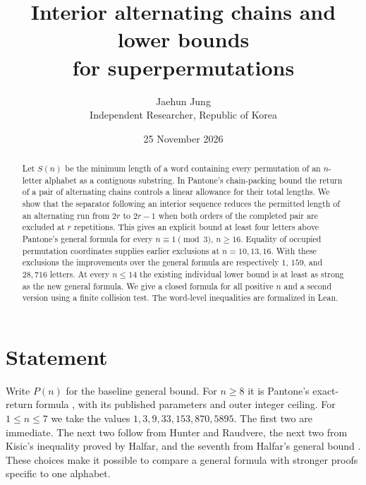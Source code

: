 \documentclass[11pt]{article}
\title{\bfseries Interior alternating chains and lower bounds\\for superpermutations}
\author{Jaehun Jung\\{\small Independent Researcher, Republic of Korea}}
\date{25 November 2026}
\begin{document}
\maketitle
\begin{abstract}
Let $S(n)$ be the minimum length of a word containing every permutation of an
$n$-letter alphabet as a contiguous substring.
In Pantone's chain-packing bound the return of a pair of alternating chains
controls a linear allowance for their total lengths. We show that the
separator following an interior sequence reduces the permitted length of an
alternating run from $2r$ to $2r-1$ when both orders of the completed pair
are excluded at $r$ repetitions. This gives an explicit bound at least four
letters above Pantone's general formula for every $n\equiv1\pmod 3$, $n\ge16$.
Equality of occupied permutation coordinates supplies earlier exclusions at
$n=10,13,16$. With these exclusions the improvements over the general formula
are respectively $1$, $159$, and $28{,}716$ letters. At every $n\le14$ the existing individual lower bound is at
least as strong as the new general formula. We give a closed formula for all
positive $n$ and a second version using a finite collision test. The word-level inequalities are formalized in Lean.
\end{abstract}

\section{Statement}
Write $P(n)$ for the baseline general bound. For $n\ge8$ it is Pantone's
exact-return formula \cite{pantone,record34}, with its published parameters
and outer integer ceiling. For $1\le n\le7$ we take the values
$1,3,9,33,153,870,5895$. The first two are immediate. The next two
follow from Hunter and Raudvere, the next two from Kisic's inequality
proved by Halfar, and the seventh from Halfar's general bound
\cite{small,halfar}. These choices make it possible to compare a general
formula with stronger proofs specific to one alphabet.
\end{document}
